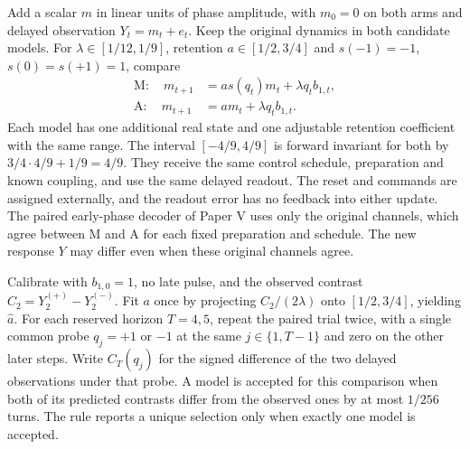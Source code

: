 \documentclass[11pt,a4paper]{article}
\begin{document}
Add a scalar $m$ in linear units of phase amplitude, with $m_0=0$ on both arms and delayed observation $Y_t=m_t+e_t$. Keep the original dynamics in both candidate models. For $\lambda\in[1/12,1/9]$, retention $a\in[1/2,3/4]$ and $s(-1)=-1$, $s(0)=s(+1)=1$, compare
\begin{align*}
 \text{M}\colon\quad m_{t+1} &= a s(q_t)m_t+\lambda q_tb_{1,t},\\
 \text{A}\colon\quad m_{t+1} &= a m_t+\lambda q_tb_{1,t}.
\end{align*}
Each model has one additional real state and one adjustable retention coefficient with the same range. The interval $[-4/9,4/9]$ is forward invariant for both by $3/4\cdot4/9+1/9=4/9$. They receive the same control schedule, preparation and known coupling, and use the same delayed readout. The reset and commands are assigned externally, and the readout error has no feedback into either update. The paired early-phase decoder of Paper V uses only the original channels, which agree between M and A for each fixed preparation and schedule. The new response $Y$ may differ even when these original channels agree.

Calibrate with $b_{1,0}=1$, no late pulse, and the observed contrast $C_2=Y_2^{(+)}-Y_2^{(-)}$. Fit $a$ once by projecting $C_2/(2\lambda)$ onto $[1/2,3/4]$, yielding $\hat a$. For each reserved horizon $T=4,5$, repeat the paired trial twice, with a single common probe $q_j=+1$ or $-1$ at the same $j\in\{1,T-1\}$ and zero on the other later steps. Write $C_T(q_j)$ for the signed difference of the two delayed observations under that probe. A model is accepted for this comparison when both of its predicted contrasts differ from the observed ones by at most $1/256$ turns. The rule reports a unique selection only when exactly one model is accepted.
\end{document}
